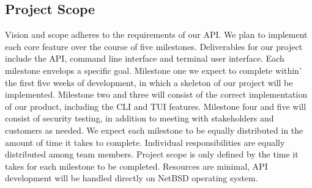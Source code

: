 \subsection{Project Scope}

Vision and scope adheres to the requirements of our API. We plan to implement each core feature over the course of five milestones. 
Deliverables for our project include the API, command line interface and terminal user interface. Each milestone envelops a 
specific goal. Milestone one we expect to complete within’ the first five weeks of development, in which a skeleton of our project 
will be implemented. Milestone two and three will consist of the correct implementation of our product, including the CLI and TUI features. 
Milestone four and five will consist of security testing, in addition to meeting with stakeholders and customers as needed. We expect each 
milestone to be equally distributed in the amount of time it takes to complete. Individual responsibilities are equally distributed among 
team members. Project scope is only defined by the time it takes for each milestone to be completed. Resources are minimal, API development 
will be handled directly on NetBSD operating system. 
